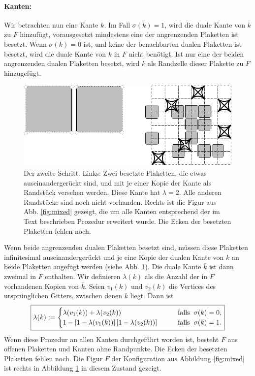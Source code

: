 \paragraph{Kanten:} Wir betrachten nun eine Kante $k$. Im Fall $\sigma(k)=1$, wird die duale Kante von $k$ zu $F$ hinzuf\"ugt, vorausgesetzt mindestens eine der angrenzenden Plaketten ist besetzt. Wenn $\sigma(k)=0$ ist, und keine der benachbarten dualen Plaketten ist besetzt, wird die duale Kante von $k$ in $F$ nicht ben\"otigt. Ist nur eine der beiden angrenzenden dualen Plaketten besetzt, wird $k$ als Randzelle dieser Plakette zu $F$ hinzugef\"ugt. 
\begin{figure}[tbp]
  \centering
  \includegraphics{./Mixed-figs/kanten2}
  \caption{Der zweite Schritt. Links: Zwei besetzte Plaketten, die etwas auseinanderger\"uckt sind, und mit je einer Kopie der Kante als Randst\"uck versehen werden.  Diese Kante hat $\lambda=2$. Alle anderen Randst\"ucke sind noch nicht vorhanden. Rechts ist die Figur aus Abb. \ref{fig:mixed} gezeigt, die um alle Kanten entsprechend der im Text beschrieben Prozedur erweitert wurde. Die Ecken der besetzten Plaketten fehlen noch.}
  \label{fig:kanten}
\end{figure}
Wenn beide angrenzenden dualen Plaketten besetzt sind, m\"ussen diese Plaketten infinitesimal auseinanderger\"uckt und je eine Kopie der dualen Kante von $k$ an beide Plaketten angef\"ugt werden (siehe Abb. \ref{fig:kanten}). Die duale Kante $\bar{k}$ ist dann zweimal in $F$ enthalten. Wir definieren $\lambda(k)$ als die Anzahl der in $F$ vorhandenen Kopien von $\bar{k}$. Seien $v_1(k)$ und $v_2(k)$ die Vertices des urspr\"unglichen Gitters, zwischen denen $k$ liegt. Dann ist 
\begin{equation}
\fbox{$\displaystyle
  \lambda(k):=\begin{cases} \lambda(v_1(k))+ \lambda(v_2(k)) \qquad & \text{falls}\;\; \sigma(k)=0, \\
 1-\left[1-\lambda(v_1(k))\right]\left[1-\lambda(v_2(k))\right] \qquad & \text{falls} \;\; \sigma(k)=1.\end{cases}
$}
\end{equation}
Wenn diese Prozedur an allen Kanten durchgef\"uhrt worden ist, besteht $F$ aus offenen Plaketten und Kanten ohne Randpunkte. Die Ecken der besetzten Plaketten fehlen noch. Die Figur $F$ der Konfiguration aus Abbildung \ref{fig:mixed} ist rechts in Abbildung \ref{fig:kanten} in diesem Zustand gezeigt.

